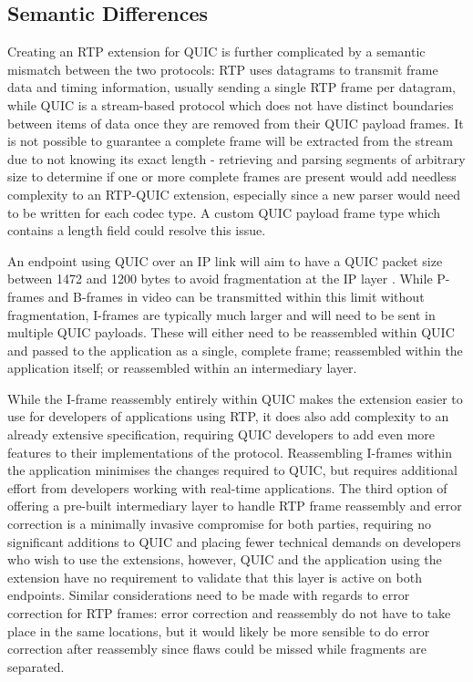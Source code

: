 \documentclass{mprop}
\begin{document}
\subsection{Semantic Differences}

Creating an RTP extension for QUIC is further complicated by a semantic mismatch between the two protocols: RTP uses datagrams to transmit frame data and timing information, usually sending a single RTP frame per datagram, while QUIC is a stream-based protocol which does not have distinct boundaries between items of data once they are removed from their QUIC payload frames. It is not possible to guarantee a complete frame will be extracted from the stream due to not knowing its exact length - retrieving and parsing segments of arbitrary size to determine if one or more complete frames are present would add needless complexity to an RTP-QUIC extension, especially since a new parser would need to be written for each codec type. A custom QUIC payload frame type which contains a length field could resolve this issue.

An endpoint using QUIC over an IP link will aim to have a QUIC packet size between 1472 and 1200 bytes to avoid fragmentation at the IP layer \cite{quic-transport-16}. While P-frames and B-frames in video can be transmitted within this limit without fragmentation, I-frames are typically much larger and will need to be sent in multiple QUIC payloads. These will either need to be reassembled within QUIC and passed to the application as a single, complete frame; reassembled within the application itself; or reassembled within an intermediary layer.

While the I-frame reassembly entirely within QUIC makes the extension easier to use for developers of applications using RTP, it does also add complexity to an already extensive specification, requiring QUIC developers to add even more features to their implementations of the protocol. Reassembling I-frames within the application minimises the changes required to QUIC, but requires additional effort from developers working with real-time applications. The third option of offering a pre-built intermediary layer to handle RTP frame reassembly and error correction is a minimally invasive compromise for both parties, requiring no significant additions to QUIC and placing fewer technical demands on developers who wish to use the extensions, however, QUIC and the application using the extension have no requirement to validate that this layer is active on both endpoints. Similar considerations need to be made with regards to error correction for RTP frames: error correction and reassembly do not have to take place in the same locations, but it would likely be more sensible to do error correction after reassembly since flaws could be missed while fragments are separated.
\end{document}
